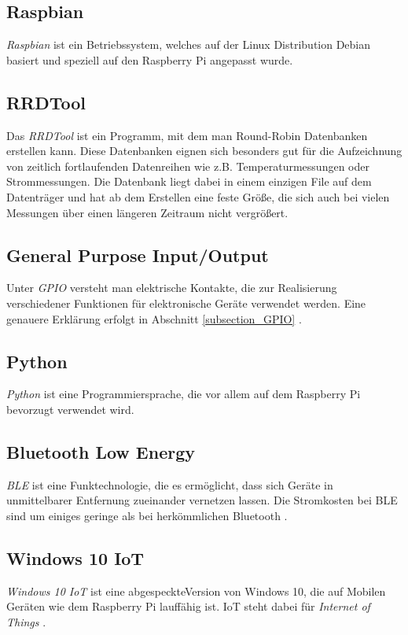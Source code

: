 \subsection*{Raspbian}
\textit{Raspbian} ist ein Betriebssystem, welches auf der Linux Distribution Debian basiert und speziell auf den Raspberry Pi angepasst wurde.

\subsection*{RRDTool}
Das \textit{RRDTool} ist ein Programm, mit dem man Round-Robin Datenbanken erstellen kann. Diese Datenbanken eignen sich besonders gut für die Aufzeichnung von zeitlich fortlaufenden Datenreihen wie z.B. Temperaturmessungen oder Strommessungen. Die Datenbank liegt dabei in einem einzigen File auf dem Datenträger und hat ab dem Erstellen eine feste Größe, die sich auch bei vielen Messungen über einen längeren Zeitraum nicht vergrößert. 

\subsection*{General Purpose Input/Output}
Unter \textit{\ac{GPIO}} versteht man elektrische Kontakte, die zur Realisierung verschiedener Funktionen für elektronische Geräte verwendet werden. Eine genauere Erklärung erfolgt in Abschnitt \ref{subsection_GPIO} \citep{Raspberri_Pi_Handbuch}.
\subsection*{Python}
\textit{Python} ist eine Programmiersprache, die vor allem auf dem Raspberry Pi bevorzugt verwendet wird.
\subsection*{Bluetooth Low Energy}
\textit{\ac{BLE}} ist eine Funktechnologie, die es ermöglicht, dass sich Geräte in unmittelbarer Entfernung zueinander vernetzen lassen. Die Stromkosten bei \ac{BLE} sind um einiges geringe als bei herkömmlichen Bluetooth \citep{Bluetooth_Low_Energy}.
\subsection*{Windows 10 IoT}
\textit{Windows 10 IoT} ist eine \glqq abgespeckte\grqq Version von Windows 10, die auf Mobilen Geräten wie dem Raspberry Pi lauffähig ist. IoT steht dabei für \textit{Internet of Things} \citep{Raspberri_Pi_Handbuch}.

